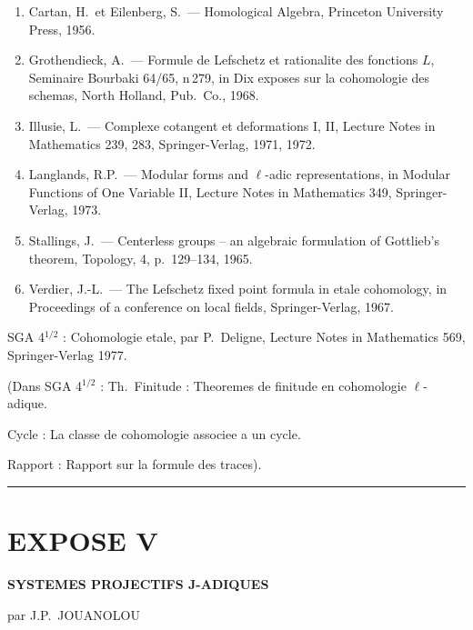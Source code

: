 \begin{enumerate}
\item[{[1]}] Cartan, H.\ et Eilenberg, S.\ --- Homological Algebra, Princeton University Press, 1956.

\item[{[2]}] Grothendieck, A.\ --- Formule de Lefschetz et rationalite des fonctions $L$, Seminaire Bourbaki 64/65, n\textdegree\,279, in Dix exposes sur la cohomologie des schemas, North Holland, Pub.\ Co., 1968.

\item[{[3]}] Illusie, L.\ --- Complexe cotangent et deformations I, II, Lecture Notes in Mathematics 239, 283, Springer-Verlag, 1971, 1972.

\item[{[4]}] Langlands, R.P.\ --- Modular forms and $\ell$-adic representations, in Modular Functions of One Variable II, Lecture Notes in Mathematics 349, Springer-Verlag, 1973.

\item[{[5]}] Stallings, J.\ --- Centerless groups -- an algebraic formulation of Gottlieb's theorem, Topology, 4, p.\ 129--134, 1965.

\item[{[6]}] Verdier, J.-L.\ --- The Lefschetz fixed point formula in etale cohomology, in Proceedings of a conference on local fields, Springer-Verlag, 1967.
\end{enumerate}

\bigskip
\noindent SGA 4$^{1/2}$ : Cohomologie etale, par P.\ Deligne, Lecture Notes in Mathematics 569, Springer-Verlag 1977.

\medskip
\noindent (Dans SGA 4$^{1/2}$ : Th.\ Finitude : Theoremes de finitude en cohomologie $\ell$-adique.

Cycle : La classe de cohomologie associee a un cycle.

Rapport : Rapport sur la formule des traces).

\bigskip
\hrule
\bigskip

\part*{EXPOSE V}

\begin{center}
\Large\bf SYSTEMES PROJECTIFS J-ADIQUES
\end{center}

\begin{center}
par J.P.\ JOUANOLOU
\end{center}

